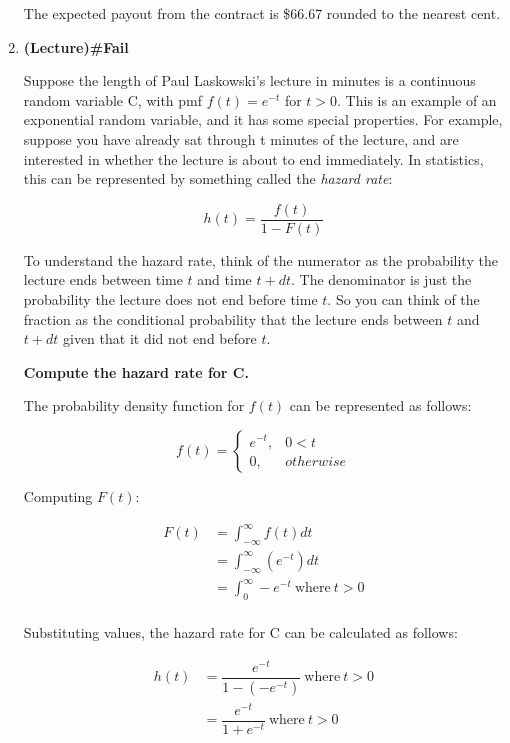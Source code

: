 \documentclass[12pt,a4paper]{article}
\numberwithin{equation}{subsection}
\begin{document}
\begin{enumerate}
The expected payout from the contract is \$66.67 rounded to the nearest cent.


\item \textbf{(Lecture)\#Fail}

Suppose the length of Paul Laskowski's lecture in minutes is a continuous random variable C, with pmf $f(t) = e^{-t}$ for $t > 0$.  This is an example of an exponential random variable, and it has some special properties.  For example, suppose you have already sat through t minutes of the lecture, and are interested in whether the lecture is about to end immediately.  In statistics, this can be represented by something called the \textit{hazard rate}:

$$h(t) = \frac{f(t)}{1-F(t)}$$

To understand the hazard rate, think of the numerator as the probability the lecture ends between time $t$ and time $t+ dt$.  The denominator is just the probability the lecture does not end before time $t$.  So you can think of the fraction as the conditional probability that the lecture ends between $t$ and $t + dt$ given that it did not end before $t$.

\textbf{Compute the hazard rate for C.}

The probability density function for $f(t)$ can be represented as follows:

$$f(t) = \begin{cases} e^{-t}, &0 < t \\
0, &otherwise
\end{cases}
$$

Computing $F(t)$:

\begin{equation*}
\begin{split}
F(t) &= \int_{-\infty}^{\infty}f(t)dt \\
&= \int_{-\infty}^{\infty}(e^{-t})dt \\
&= \int_{0}^{\infty}-e^{-t} \: \text{where} \: t > 0 \\
\end{split}
\end{equation*}

Substituting values, the hazard rate for C can be calculated as follows:

\begin{equation*}
\begin{split}
h(t) &= \dfrac{e^{-t}}{1 - (-e^{-t})} \: \text{where} \: t > 0 \\
&= \dfrac{e^{-t}}{1 + e^{-t}} \: \text{where} \: t > 0 \\
\end{split}
\end{equation*}

\end{enumerate}
\end{document}
